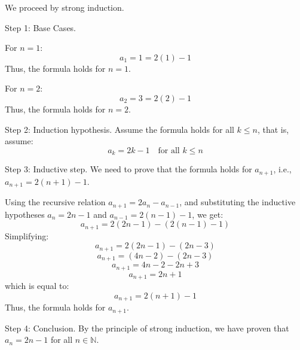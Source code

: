 \documentclass[12pt]{amsart}
\begin{document}
\begin{problem}[4.23a]
We proceed by strong induction.

Step 1: {Base Cases.}

\noindent For \( n = 1 \):
\[
	a_1 = 1 = 2(1) - 1
\]
Thus, the formula holds for \( n = 1 \).

\noindent For \( n = 2 \):
\[
	a_2 = 3 = 2(2) - 1
\]
Thus, the formula holds for \( n = 2 \).

\vspace{10pt}

Step 2: Induction hypothesis. Assume the formula holds for all \( k \leq n \), that is, assume:
\[
	a_k = 2k - 1 \quad \text{for all } k \leq n
\]


Step 3: Inductive step.
We need to prove that the formula holds for \( a_{n+1} \), i.e., \( a_{n+1} = 2(n+1) - 1 \).

Using the recursive relation \( a_{n+1} = 2a_n - a_{n-1} \), and substituting the inductive hypotheses \( a_n = 2n - 1 \) and \( a_{n-1} = 2(n-1) - 1 \), we get:
\[
	a_{n+1} = 2(2n - 1) - \left(2(n-1) - 1\right)
\]
Simplifying:
\[
	a_{n+1} = 2(2n - 1) - (2n - 3)
\]
\[
	a_{n+1} = (4n - 2) - (2n - 3)
\]
\[
	a_{n+1} = 4n - 2 - 2n + 3
\]
\[
	a_{n+1} = 2n + 1
\]
which is equal to:
\[
	a_{n+1} = 2(n+1) - 1
\]
Thus, the formula holds for \( a_{n+1} \).

\vspace{10pt}

Step 4: Conclusion. By the principle of strong induction, we have proven that \( a_n = 2n - 1 \) for all \( n \in \mathbb{N} \).
\end{problem}





%
%
\end{document}
